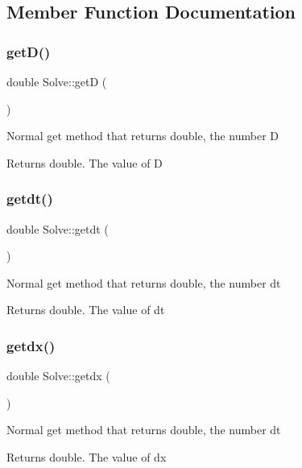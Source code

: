 \subsection{Member Function Documentation}
\mbox{\label{class_solve_a0edcf69bae8414576fbb1b35ba395a1c}} 
\subsubsection{\texorpdfstring{get\+D()}{getD()}}
{\footnotesize\ttfamily double Solve\+::getD (\begin{DoxyParamCaption}{ }\end{DoxyParamCaption})}

Normal get method that returns double, the number D \begin{DoxyReturn}{Returns}
double. The value of D 
\end{DoxyReturn}
\mbox{\label{class_solve_a981e11c3c390bc54041a8e60ebdcc4bf}} 
\subsubsection{\texorpdfstring{getdt()}{getdt()}}
{\footnotesize\ttfamily double Solve\+::getdt (\begin{DoxyParamCaption}{ }\end{DoxyParamCaption})}

Normal get method that returns double, the number dt \begin{DoxyReturn}{Returns}
double. The value of dt 
\end{DoxyReturn}
\mbox{\label{class_solve_aad066a37070623f3c1bfb5f001fd2a50}} 
\subsubsection{\texorpdfstring{getdx()}{getdx()}}
{\footnotesize\ttfamily double Solve\+::getdx (\begin{DoxyParamCaption}{ }\end{DoxyParamCaption})}

Normal get method that returns double, the number dt \begin{DoxyReturn}{Returns}
double. The value of dx 
\end{DoxyReturn}
\mbox{\label{class_solve_a7d9d481ed1bf8bbfc5bf37517e2a12c6}} 
